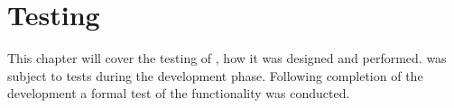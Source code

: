 \chapter{Testing}
This chapter will cover the testing of \projectname{}, how it was designed and performed.
\projectname{} was subject to tests during the development phase.
Following completion of the development a formal test of the functionality was conducted.




